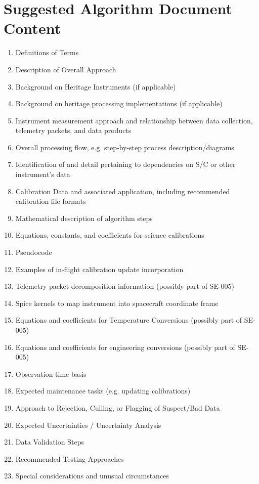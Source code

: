 \documentclass{report}
\begin{document}

\section{Suggested Algorithm Document Content}
\begin{enumerate}
  \item Definitions of Terms
  \item Description of Overall Approach
  \item Background on Heritage Instruments (if applicable)
  \item Background on heritage processing implementations (if applicable)
  \item Instrument measurement approach and relationship between data collection, telemetry packets, and data products
  \item Overall processing flow, e.g. step-by-step process description/diagrams
  \item Identification of and detail pertaining to dependencies on S/C or other instrument's data
  \item Calibration Data and associated application, including recommended calibration file formats
  \item Mathematical description of algorithm steps
  \item Equations, constants, and coefficients for science calibrations
  \item Pseudocode
  \item Examples of in-flight calibration update incorporation
  \item Telemetry packet decomposition information (possibly part of SE-005)
  \item Spice kernels to map instrument into spacecraft coordinate frame
  \item Equations and coefficients for Temperature Conversions (possibly part of SE-005)
  \item Equations and coefficients for engineering conversions (possibly part of SE-005)
  \item Observation time basis
  \item Expected maintenance tasks (e.g. updating calibrations)
  \item Approach to Rejection, Culling, or Flagging of Suspect/Bad Data
  \item Expected Uncertainties / Uncertainty Analysis
  \item Data Validation Steps
  \item Recommended Testing Approaches
  \item Special considerations and unusual circumstances
\end{enumerate}
\end{document}
